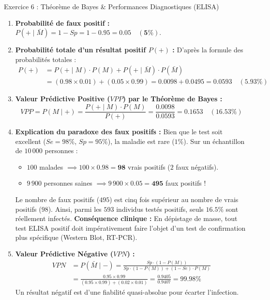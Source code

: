 \documentclass[11pt,a4paper]{article}
\begin{document}
\begin{solutionbox}{Exercice 6 : Théorème de Bayes \& Performances Diagnostiques (ELISA)}
\begin{enumerate}[label=\textbf{\alph*.}]
  \item \textbf{Probabilité de faux positif :}
  $P(+ \mid \bar{M}) = 1 - Sp = 1 - 0.95 = \mathbf{0.05 \quad (5\%)}$.

  \item \textbf{Probabilité totale d'un résultat positif $P(+)$ :}
  D'après la formule des probabilités totales :
  \begin{align*}
    P(+) &= P(+ \mid M) \cdot P(M) + P(+ \mid \bar{M}) \cdot P(\bar{M}) \\
    &= (0.98 \times 0.01) + (0.05 \times 0.99) = 0.0098 + 0.0495 = \mathbf{0.0593 \quad (5.93\%)}
  \end{align*}

  \item \textbf{Valeur Prédictive Positive ($VPP$) par le Théorème de Bayes :}
  \begin{equation*}
    VPP = P(M \mid +) = \frac{P(+ \mid M) \cdot P(M)}{P(+)} = \frac{0.0098}{0.0593} = \mathbf{0.1653 \quad (16.53\%)}
  \end{equation*}

  \item \textbf{Explication du paradoxe des faux positifs :}
  Bien que le test soit excellent ($Se = 98\%$, $Sp = 95\%$), la maladie est rare ($1\%$). Sur un échantillon de $10\,000$ personnes :
  \begin{itemize}
    \item $100$ malades $\implies 100 \times 0.98 = \mathbf{98}$ vrais positifs ($2$ faux négatifs).
    \item $9\,900$ personnes saines $\implies 9\,900 \times 0.05 = \mathbf{495}$ faux positifs !
  \end{itemize}
  Le nombre de faux positifs ($495$) est cinq fois supérieur au nombre de vrais positifs ($98$). Ainsi, parmi les $593$ individus testés positifs, seuls $16.5\%$ sont réellement infectés. \textbf{Conséquence clinique :} En dépistage de masse, tout test ELISA positif doit impérativement faire l'objet d'un test de confirmation plus spécifique (Western Blot, RT-PCR).

  \item \textbf{Valeur Prédictive Négative ($VPN$) :}
  \begin{align*}
    VPN &= P(\bar{M} \mid -) = \frac{Sp \cdot (1 - P(M))}{Sp \cdot (1 - P(M)) + (1 - Se) \cdot P(M)} \\
    &= \frac{0.95 \times 0.99}{(0.95 \times 0.99) + (0.02 \times 0.01)} = \frac{0.9405}{0.9407} = \mathbf{99.98\%}
  \end{align*}
  Un résultat négatif est d'une fiabilité quasi-absolue pour écarter l'infection.


\end{enumerate}
\end{solutionbox}
\end{document}
